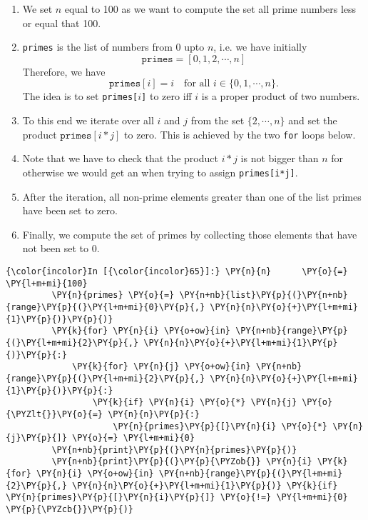 \begin{enumerate}
\item We set $n$ equal to 100 as we want to compute the set all prime numbers less or equal that 100.
\item \texttt{primes} is the list of numbers from 0 upto $n$, i.e. we have initially
      $$ \texttt{primes} = [0,1,2,\cdots,n] $$
      Therefore, we have
      $$ \texttt{primes}[i] = i \quad \mbox{for all $i \in \{0,1,\cdots,n\}$.} $$
      The idea is to set \texttt{primes[$i$]} to zero iff $i$ is a proper product of two numbers.

\item To this end we iterate over all $i$ and $j$ from the set $\{2,\cdots,n\}$
  and set the product $\texttt{primes}[i*j]$ to zero.  This is achieved by the two \texttt{for} loops below.
\item Note that we have to check that the product $i * j$ is not bigger than $n$ for otherwise we would get an
    when trying to assign \texttt{primes[i*j]}.
\item After the iteration, all non-prime elements greater than one of the list primes have been set to zero.
\item Finally, we compute the set of primes by collecting those elements that have not been set to $0$.
\end{enumerate}

\begin{Verbatim}[commandchars=\\\{\}]
{\color{incolor}In [{\color{incolor}65}]:} \PY{n}{n}      \PY{o}{=} \PY{l+m+mi}{100}
         \PY{n}{primes} \PY{o}{=} \PY{n+nb}{list}\PY{p}{(}\PY{n+nb}{range}\PY{p}{(}\PY{l+m+mi}{0}\PY{p}{,} \PY{n}{n}\PY{o}{+}\PY{l+m+mi}{1}\PY{p}{)}\PY{p}{)}
         \PY{k}{for} \PY{n}{i} \PY{o+ow}{in} \PY{n+nb}{range}\PY{p}{(}\PY{l+m+mi}{2}\PY{p}{,} \PY{n}{n}\PY{o}{+}\PY{l+m+mi}{1}\PY{p}{)}\PY{p}{:}
             \PY{k}{for} \PY{n}{j} \PY{o+ow}{in} \PY{n+nb}{range}\PY{p}{(}\PY{l+m+mi}{2}\PY{p}{,} \PY{n}{n}\PY{o}{+}\PY{l+m+mi}{1}\PY{p}{)}\PY{p}{:}
                 \PY{k}{if} \PY{n}{i} \PY{o}{*} \PY{n}{j} \PY{o}{\PYZlt{}}\PY{o}{=} \PY{n}{n}\PY{p}{:}
                     \PY{n}{primes}\PY{p}{[}\PY{n}{i} \PY{o}{*} \PY{n}{j}\PY{p}{]} \PY{o}{=} \PY{l+m+mi}{0}
         \PY{n+nb}{print}\PY{p}{(}\PY{n}{primes}\PY{p}{)}
         \PY{n+nb}{print}\PY{p}{(}\PY{p}{\PYZob{}} \PY{n}{i} \PY{k}{for} \PY{n}{i} \PY{o+ow}{in} \PY{n+nb}{range}\PY{p}{(}\PY{l+m+mi}{2}\PY{p}{,} \PY{n}{n}\PY{o}{+}\PY{l+m+mi}{1}\PY{p}{)} \PY{k}{if} \PY{n}{primes}\PY{p}{[}\PY{n}{i}\PY{p}{]} \PY{o}{!=} \PY{l+m+mi}{0} \PY{p}{\PYZcb{}}\PY{p}{)}
\end{Verbatim}

